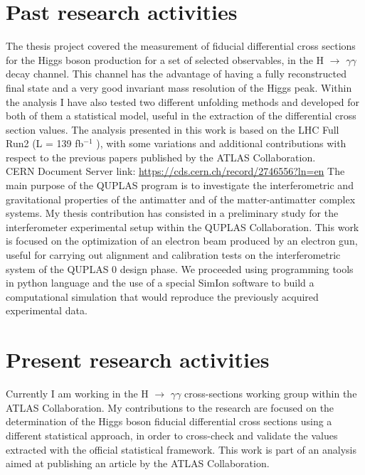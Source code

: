 \documentclass[11pt,a4paper,roman]{moderncv}        %
\begin{document}
\section{Past research activities}
{The thesis project covered the measurement of fiducial differential cross sections for the Higgs boson production for a set of selected observables, in the H $\rightarrow$  $\gamma\gamma$ decay channel. This channel has the advantage of having a fully reconstructed final state and a very good invariant mass resolution of the Higgs peak. Within the analysis I have also tested two different unfolding methods and developed for both of them a statistical model, useful in the extraction of the differential cross section values. The analysis presented in this work is based on the LHC Full Run2 (L = 139 fb$^{-1}$ ), with some variations and additional contributions with respect to the previous papers published by the ATLAS Collaboration. \\
\newline CERN Document Server link: \url{https://cds.cern.ch/record/2746556?ln=en}}
{The main purpose of the QUPLAS program is to investigate the interferometric and gravitational properties of the antimatter and of the matter-antimatter complex systems. My thesis contribution has consisted in a preliminary study for the interferometer experimental setup within the QUPLAS Collaboration. This work is focused on the optimization of an electron beam produced by an electron gun, useful for carrying out alignment and calibration tests on the interferometric system of the QUPLAS 0 design phase. We proceeded using programming tools in python language and the use of a special SimIon software to build a computational simulation that would reproduce the previously acquired experimental data.}

\section{Present research activities}
{Currently I am working in the H $\rightarrow$ $\gamma\gamma$ cross-sections working group within the ATLAS Collaboration. My contributions to the research are focused on the determination of the Higgs boson fiducial differential cross sections using a different statistical approach, in order to cross-check and validate the values extracted with the official statistical framework.
This work is part of an analysis aimed at publishing an article by the ATLAS Collaboration.}
\end{document}
